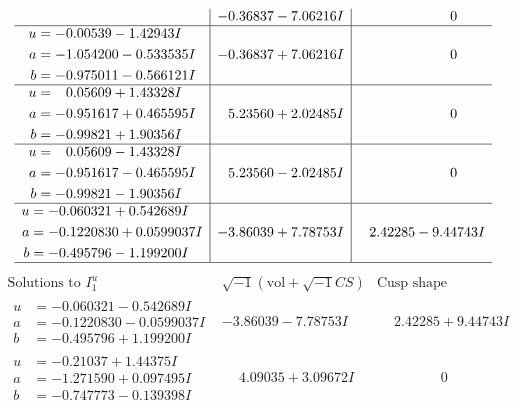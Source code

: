 \documentclass[1p]{elsarticle_modified}
\theoremstyle{definition}
\newcommand{\I}{\sqrt{-1}}
\begin{document}
$$\begin{array}{c|c|c}
 & -0.36837 - 7.06216 I & \phantom{-0.000000 } 0 \\ \hline\begin{aligned}
u &= -0.00539 - 1.42943 I \\
a &= -1.054200 - 0.533535 I \\
b &= -0.975011 - 0.566121 I\end{aligned}
 & -0.36837 + 7.06216 I & \phantom{-0.000000 } 0 \\ \hline\begin{aligned}
u &= \phantom{-}0.05609 + 1.43328 I \\
a &= -0.951617 + 0.465595 I \\
b &= -0.99821 + 1.90356 I\end{aligned}
 & \phantom{-}5.23560 + 2.02485 I & \phantom{-0.000000 } 0 \\ \hline\begin{aligned}
u &= \phantom{-}0.05609 - 1.43328 I \\
a &= -0.951617 - 0.465595 I \\
b &= -0.99821 - 1.90356 I\end{aligned}
 & \phantom{-}5.23560 - 2.02485 I & \phantom{-0.000000 } 0 \\ \hline\begin{aligned}
u &= -0.060321 + 0.542689 I \\
a &= -0.1220830 + 0.0599037 I \\
b &= -0.495796 - 1.199200 I\end{aligned}
 & -3.86039 + 7.78753 I & \phantom{-}2.42285 - 9.44743 I\\
 \hline 
 \end{array}$$\newpage$$\begin{array}{c|c|c}  
\text{Solutions to }I^u_{1}& \I (\text{vol} + \sqrt{-1}CS) & \text{Cusp shape}\\
 \hline 
\begin{aligned}
u &= -0.060321 - 0.542689 I \\
a &= -0.1220830 - 0.0599037 I \\
b &= -0.495796 + 1.199200 I\end{aligned}
 & -3.86039 - 7.78753 I & \phantom{-}2.42285 + 9.44743 I \\ \hline\begin{aligned}
u &= -0.21037 + 1.44375 I \\
a &= -1.271590 + 0.097495 I \\
b &= -0.747773 - 0.139398 I\end{aligned}
 & \phantom{-}4.09035 + 3.09672 I & \phantom{-0.000000 } 0 \\ \hline\begin{aligned}

\end{aligned}
\end{array}$$
\end{document}
